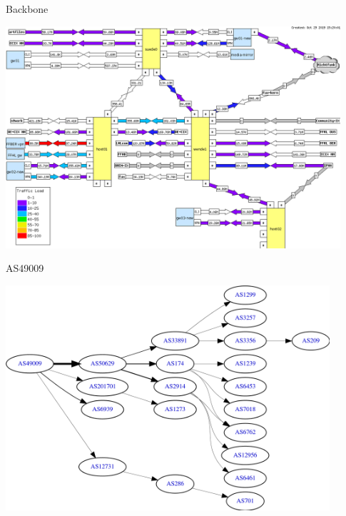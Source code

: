 \documentclass[t]{beamer}
\begin{document}
\begin{frame}{Backbone}
  \begin{center}
    \includegraphics[width=0.93\textwidth]{Bilder/backbone}
  \end{center}
\end{frame}

\begin{frame}{AS49009}
  \begin{center}
    \includegraphics[width=0.9\textwidth]{Bilder/as}
  \end{center}
\end{frame}
\end{document}
